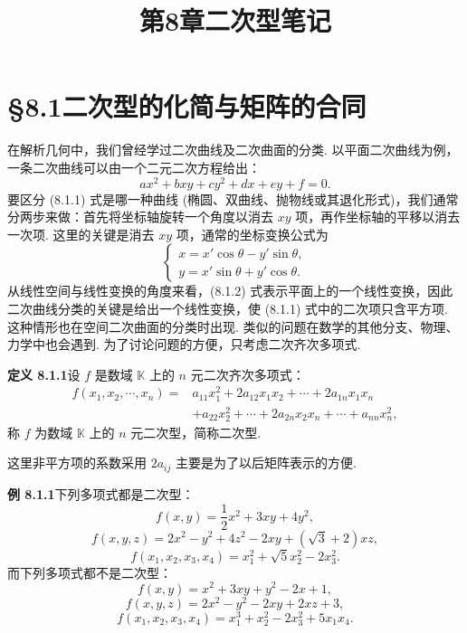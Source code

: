 \documentclass[UTF8,12pt,a4paper,fontset=fandol]{ctexart}
\title{第8章\quad 二次型笔记}
\author{}
\date{}
\begin{document}
\maketitle

\section*{§8.1\quad 二次型的化简与矩阵的合同}

在解析几何中，我们曾经学过二次曲线及二次曲面的分类. 以平面二次曲线为例，一条二次曲线可以由一个二元二次方程给出：
\begin{equation}
ax^2+bxy+cy^2+dx+ey+f=0.
\tag{8.1.1}
\end{equation}
要区分 (8.1.1) 式是哪一种曲线 (椭圆、双曲线、抛物线或其退化形式)，我们通常分两步来做：首先将坐标轴旋转一个角度以消去 $xy$ 项，再作坐标轴的平移以消去一次项. 这里的关键是消去 $xy$ 项，通常的坐标变换公式为
\begin{equation}
\left\{\begin{array}{l}
x=x'\cos\theta-y'\sin\theta,\\
y=x'\sin\theta+y'\cos\theta.
\end{array}\right.
\tag{8.1.2}
\end{equation}
从线性空间与线性变换的角度来看，(8.1.2) 式表示平面上的一个线性变换，因此二次曲线分类的关键是给出一个线性变换，使 (8.1.1) 式中的二次项只含平方项. 这种情形也在空间二次曲面的分类时出现. 类似的问题在数学的其他分支、物理、力学中也会遇到. 为了讨论问题的方便，只考虑二次齐次多项式.

\noindent\textbf{定义 8.1.1}\quad 设 $f$ 是数域 $\mathbb K$ 上的 $n$ 元二次齐次多项式：
\begin{equation}
\begin{aligned}
f(x_1,x_2,\cdots,x_n)
={}&a_{11}x_1^2+2a_{12}x_1x_2+\cdots+2a_{1n}x_1x_n\\
&+a_{22}x_2^2+\cdots+2a_{2n}x_2x_n+\cdots+a_{nn}x_n^2,
\end{aligned}
\tag{8.1.3}
\end{equation}
称 $f$ 为数域 $\mathbb K$ 上的 $n$ 元二次型，简称二次型.

这里非平方项的系数采用 $2a_{ij}$ 主要是为了以后矩阵表示的方便.

\noindent\textbf{例 8.1.1}\quad 下列多项式都是二次型：
\[
f(x,y)=\frac12x^2+3xy+4y^2,
\]
\[
f(x,y,z)=2x^2-y^2+4z^2-2xy+(\sqrt3+2)xz,
\]
\[
f(x_1,x_2,x_3,x_4)=x_1^2+\sqrt5x_2^2-2x_3^2.
\]
而下列多项式都不是二次型：
\[
f(x,y)=x^2+3xy+y^2-2x+1,
\]
\[
f(x,y,z)=2x^2-y^2-2xy+2xz+3,
\]
\[
f(x_1,x_2,x_3,x_4)=x_1^3+x_2^2-2x_3^2+5x_1x_4.
\]
\end{document}
